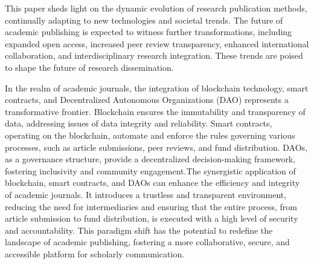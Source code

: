 \documentclass[lettersize,journal]{IEEEtran}
\begin{document}
This paper sheds light on the dynamic evolution of research publication methods, continually adapting to new technologies and societal trends. The future of academic publishing is expected to witness further transformations, including expanded open access, increased peer review transparency, enhanced international collaboration, and interdisciplinary research integration. These trends are poised to shape the future of research dissemination.

In the realm of academic journals, the integration of blockchain technology, smart contracts, and Decentralized Autonomous Organizations (DAO) represents a transformative frontier. Blockchain ensures the immutability and transparency of data, addressing issues of data integrity and reliability. Smart contracts, operating on the blockchain, automate and enforce the rules governing various processes, such as article submissions, peer reviews, and fund distribution. DAOs, as a governance structure, provide a decentralized decision-making framework, fostering inclusivity and community engagement.The synergistic application of blockchain, smart contracts, and DAOs can enhance the efficiency and integrity of academic journals. It introduces a trustless and transparent environment, reducing the need for intermediaries and ensuring that the entire process, from article submission to fund distribution, is executed with a high level of security and accountability. This paradigm shift has the potential to redefine the landscape of academic publishing, fostering a more collaborative, secure, and accessible platform for scholarly communication.
\end{document}
